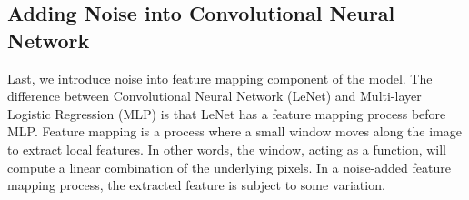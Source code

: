 \subsection{Adding Noise into Convolutional Neural Network}
Last, we introduce noise into feature mapping component of
the model. The difference between Convolutional Neural Network (LeNet) and
Multi-layer Logistic Regression (MLP) is that LeNet has a feature mapping
process before MLP. Feature mapping is a process where a small window moves along the image to extract local features. In other words, the window, acting as
a function, will compute a linear combination of the underlying pixels.
In a noise-added feature mapping process, the extracted feature is subject
to some variation.
